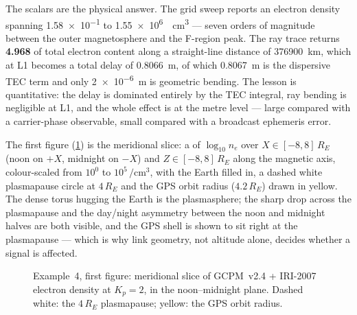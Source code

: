 The scalars are the physical answer. The grid sweep reports an electron density
spanning \SI{1.58e-1}{} to \SI{1.55e6}{\per\centi\meter\cubed} --- seven orders
of magnitude between the outer magnetosphere and the F-region peak. The ray
trace returns \textbf{\SI{4.968}{\TECU}} of total electron content along a
straight-line distance of \SI{376900}{\kilo\meter}, which at L1 becomes a total
delay of \SI{0.8066}{\meter}, of which \SI{0.8067}{\meter} is the dispersive TEC
term and only \SI{2e-6}{\meter} is geometric bending. The lesson is quantitative:
the delay is dominated entirely by the TEC integral, ray bending is negligible at
L1, and the whole effect is at the metre level --- large compared with a
carrier-phase observable, small compared with a broadcast ephemeris error.

The first figure (\cref{fig:tut-ex4-slice}) is the meridional slice: a
 of $\log_{10} n_e$ over $X\in[-8,8]\,R_E$ (noon on $+X$,
midnight on $-X$) and $Z\in[-8,8]\,R_E$ along the magnetic axis, colour-scaled
from $10^0$ to $10^5\,\si{\per\centi\meter\cubed}$, with the Earth filled in, a
dashed white plasmapause circle at $4\,R_E$ and the GPS orbit radius
($4.2\,R_E$) drawn in yellow. The dense torus hugging the Earth is the
plasmasphere; the sharp drop across the plasmapause and the day/night asymmetry
between the noon and midnight halves are both visible, and the GPS shell is
shown to sit right at the plasmapause --- which is why link geometry, not
altitude alone, decides whether a signal is affected.

\begin{figure}[htbp]
  \centering
  \caption{Example~4, first figure: meridional slice of GCPM~v2.4 + IRI-2007
           electron density at $K_p=2$, in the noon--midnight plane. Dashed
           white: the $4\,R_E$ plasmapause; yellow: the GPS orbit radius.}
  \label{fig:tut-ex4-slice}
\end{figure}


